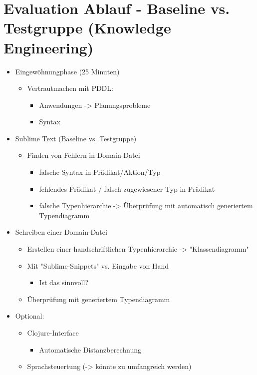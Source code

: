 \documentclass[11pt]{article}
\begin{document}
\section{Evaluation Ablauf - Baseline vs. Testgruppe (Knowledge Engineering)}
\label{sec-2}
\begin{itemize}
\item Eingewöhnungphase (25 Minuten)
\begin{itemize}
\item Vertrautmachen mit PDDL:
\begin{itemize}
\item Anwendungen -> Planungsprobleme
\item Syntax
\end{itemize}
\end{itemize}
\item Sublime Text (Baseline vs. Testgruppe)
\begin{itemize}
\item Finden von Fehlern in Domain-Datei
\begin{itemize}
\item falsche Syntax in Prädikat/Aktion/Typ
\item fehlendes Prädikat / falsch zugewiesener Typ in Prädikat
\item falsche Typenhierarchie -> Überprüfung mit automatisch
generiertem Typendiagramm
\end{itemize}
\end{itemize}
\item Schreiben einer Domain-Datei
\begin{itemize}
\item Erstellen einer handschriftlichen Typenhierarchie ->
"Klassendiagramm"
\item Mit "Sublime-Snippets" vs. Eingabe von Hand
\begin{itemize}
\item Ist das sinnvoll?
\end{itemize}
\item Überprüfung mit generiertem Typendiagramm
\end{itemize}
\item Optional:
\begin{itemize}
\item Clojure-Interface
\begin{itemize}
\item Automatische Distanzberechnung
\end{itemize}
\item Sprachsteuertung (-> könnte zu umfangreich werden)

\end{itemize}
\end{itemize}
\end{document}
